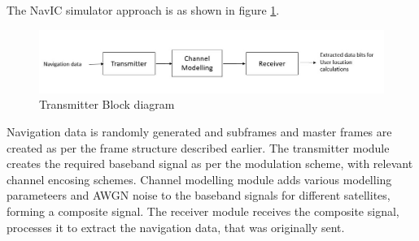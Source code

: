 The NavIC simulator approach is as shown in figure \ref{fig:sim_flow}.  

\begin{figure}[ht]
\centering
\includegraphics[width=1\columnwidth]{figs/simulation_overview.jpg}
\centering
\captionsetup{justification=centering}
\caption{Transmitter Block diagram}
\label{fig:sim_flow}
\end{figure}


Navigation data is randomly generated and subframes and master frames are created as per the frame structure described earlier. The transmitter module creates the required baseband signal as per the modulation scheme, with relevant channel encosing schemes. Channel modelling module adds various modelling parameteers and AWGN noise to the baseband signals for different satellites, forming a composite signal. The receiver module receives the composite signal, processes it to extract the navigation data, that was originally sent.  

\let\cleardoublepage\clearpage
